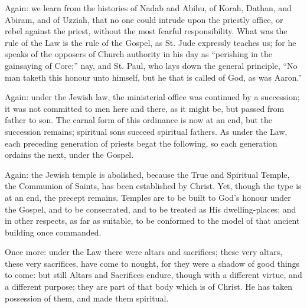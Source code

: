 Again: we learn from the histories of Nadab and Abihu, of Korah,
Dathan, and Abiram, and of Uzziah, that no one could intrude upon the
priestly office, or rebel against the priest, without the most fearful
responsibility. What was the rule of the Law is the rule of the
Gospel, as St. Jude expressly teaches us; for he speaks of the
opposers of Church authority in his day as ``perishing in the
gainsaying of Core;'' nay, and St. Paul, who lays down the general
principle, ``No man taketh this honour unto himself, but he that
is called of God, as was Aaron.''

Again: under the Jewish law, the ministerial office was continued
by a succession; it was not committed to men here and there, as it
might be, but passed from father to son. The carnal form of this
ordinance is now at an end, but the succession remains; spiritual sons
succeed spiritual fathers. As under the Law, each preceding generation
of priests begat the following, so each generation ordains the next,
under the Gospel.

Again: the Jewish temple is abolished, because the True and
Spiritual Temple, the Communion of Saints, has been established by
Christ. Yet, though the type is at an end, the precept remains.
Temples are to be built to God's honour under the Gospel, and to be
consecrated, and to be treated as His dwelling-places; and in other
respects, as far as suitable, to be conformed to the model of that
ancient building once commanded.

Once more: under the Law there were altars and sacrifices; these
very altars, these very sacrifices, have come to nought, for they were
a shadow of good things to come: but still Altars and Sacrifices
endure, though with a different virtue, and a different purpose; they
are part of that body which is of Christ. He has taken possession of
them, and made them spiritual.

